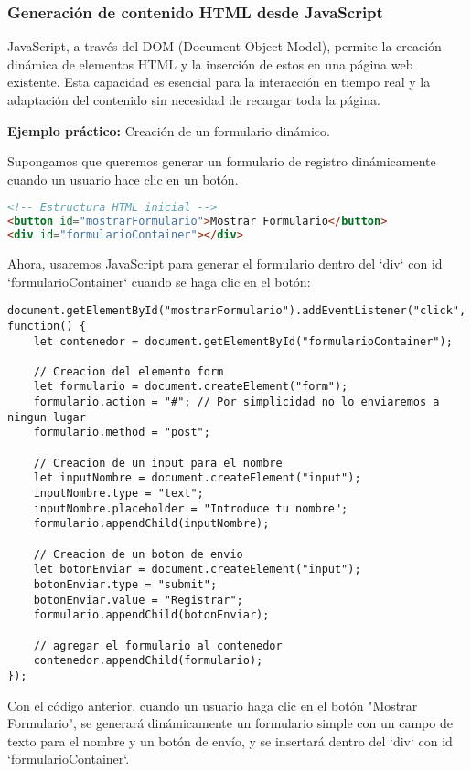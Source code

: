 \documentclass[executivepaper]{article}
\begin{document}
\subsubsection*{Generación de contenido HTML desde JavaScript}

JavaScript, a través del DOM (Document Object Model), permite la creación dinámica de elementos HTML y la inserción de estos en una página web existente. Esta capacidad es esencial para la interacción en tiempo real y la adaptación del contenido sin necesidad de recargar toda la página.

\textbf{Ejemplo práctico:} Creación de un formulario dinámico.

Supongamos que queremos generar un formulario de registro dinámicamente cuando un usuario hace clic en un botón.

\begin{lstlisting}[language=HTML]
<!-- Estructura HTML inicial -->
<button id="mostrarFormulario">Mostrar Formulario</button>
<div id="formularioContainer"></div>
\end{lstlisting}

Ahora, usaremos JavaScript para generar el formulario dentro del `div` con id `formularioContainer` cuando se haga clic en el botón:

\begin{lstlisting}
document.getElementById("mostrarFormulario").addEventListener("click", function() {
    let contenedor = document.getElementById("formularioContainer");

    // Creacion del elemento form
    let formulario = document.createElement("form");
    formulario.action = "#"; // Por simplicidad no lo enviaremos a ningun lugar
    formulario.method = "post";

    // Creacion de un input para el nombre
    let inputNombre = document.createElement("input");
    inputNombre.type = "text";
    inputNombre.placeholder = "Introduce tu nombre";
    formulario.appendChild(inputNombre);

    // Creacion de un boton de envio
    let botonEnviar = document.createElement("input");
    botonEnviar.type = "submit";
    botonEnviar.value = "Registrar";
    formulario.appendChild(botonEnviar);

    // agregar el formulario al contenedor
    contenedor.appendChild(formulario);
});
\end{lstlisting}

Con el código anterior, cuando un usuario haga clic en el botón "Mostrar Formulario", se generará dinámicamente un formulario simple con un campo de texto para el nombre y un botón de envío, y se insertará dentro del `div` con id `formularioContainer`.
\end{document}
